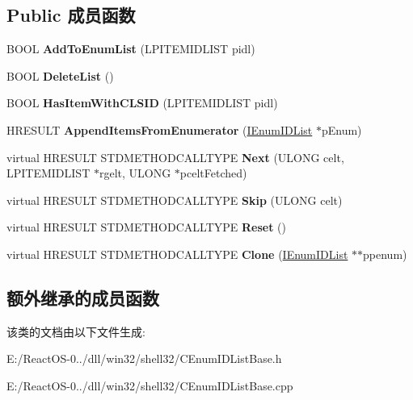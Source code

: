 \subsection*{Public 成员函数}
\begin{DoxyCompactItemize}
\item 
\mbox{\label{class_c_enum_i_d_list_base_a90282f54002dd1997eb0ff04bb429f0c}} 
B\+O\+OL {\bfseries Add\+To\+Enum\+List} (L\+P\+I\+T\+E\+M\+I\+D\+L\+I\+ST pidl)
\item 
\mbox{\label{class_c_enum_i_d_list_base_a50a2a54fd39626b89b0228d715393aa7}} 
B\+O\+OL {\bfseries Delete\+List} ()
\item 
\mbox{\label{class_c_enum_i_d_list_base_a6a4320f58148f68d9ae94cbb44c507c1}} 
B\+O\+OL {\bfseries Has\+Item\+With\+C\+L\+S\+ID} (L\+P\+I\+T\+E\+M\+I\+D\+L\+I\+ST pidl)
\item 
\mbox{\label{class_c_enum_i_d_list_base_a9fee9d2a084d2f0f9db770c9669cea97}} 
H\+R\+E\+S\+U\+LT {\bfseries Append\+Items\+From\+Enumerator} (\hyperlink{interface_i_enum_i_d_list}{I\+Enum\+I\+D\+List} $\ast$p\+Enum)
\item 
\mbox{\label{class_c_enum_i_d_list_base_a1dfb31a8c25884d47d6c178e4b69bd48}} 
virtual H\+R\+E\+S\+U\+LT S\+T\+D\+M\+E\+T\+H\+O\+D\+C\+A\+L\+L\+T\+Y\+PE {\bfseries Next} (U\+L\+O\+NG celt, L\+P\+I\+T\+E\+M\+I\+D\+L\+I\+ST $\ast$rgelt, U\+L\+O\+NG $\ast$pcelt\+Fetched)
\item 
\mbox{\label{class_c_enum_i_d_list_base_abde801ae841373f224f17b8487297add}} 
virtual H\+R\+E\+S\+U\+LT S\+T\+D\+M\+E\+T\+H\+O\+D\+C\+A\+L\+L\+T\+Y\+PE {\bfseries Skip} (U\+L\+O\+NG celt)
\item 
\mbox{\label{class_c_enum_i_d_list_base_a4fabd87105d8a5386fb36740191a2710}} 
virtual H\+R\+E\+S\+U\+LT S\+T\+D\+M\+E\+T\+H\+O\+D\+C\+A\+L\+L\+T\+Y\+PE {\bfseries Reset} ()
\item 
\mbox{\label{class_c_enum_i_d_list_base_a47f7e5805d818d2999cec68113bdb87e}} 
virtual H\+R\+E\+S\+U\+LT S\+T\+D\+M\+E\+T\+H\+O\+D\+C\+A\+L\+L\+T\+Y\+PE {\bfseries Clone} (\hyperlink{interface_i_enum_i_d_list}{I\+Enum\+I\+D\+List} $\ast$$\ast$ppenum)
\end{DoxyCompactItemize}
\subsection*{额外继承的成员函数}


该类的文档由以下文件生成\+:\begin{DoxyCompactItemize}
\item 
E\+:/\+React\+O\+S-\/0../dll/win32/shell32/C\+Enum\+I\+D\+List\+Base.\+h\item 
E\+:/\+React\+O\+S-\/0../dll/win32/shell32/C\+Enum\+I\+D\+List\+Base.\+cpp\end{DoxyCompactItemize}
